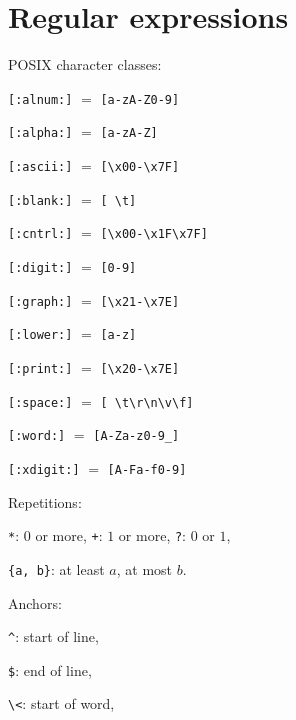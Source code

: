 \section{Regular expressions}
\begin{itemx}
\item POSIX character classes:
\begin{itemx}
\item \texttt{[:alnum:]} $=$ \texttt{[a-zA-Z0-9]}
\item \texttt{[:alpha:]} $=$ \texttt{[a-zA-Z]}
\item \texttt{[:ascii:]} $=$ \texttt{[\textbackslash{}x00-\textbackslash{}x7F]}
\item \texttt{[:blank:]} $=$ \texttt{[ \textbackslash{}t]}
\item \texttt{[:cntrl:]} $=$ \texttt{[\textbackslash{}x00-\textbackslash{}x1F\textbackslash{}x7F]}
\item \texttt{[:digit:]} $=$ \texttt{[0-9]}
\item \texttt{[:graph:]} $=$ \texttt{[\textbackslash{}x21-\textbackslash{}x7E]}
\item \texttt{[:lower:]} $=$ \texttt{[a-z]}
\item \texttt{[:print:]} $=$ \texttt{[\textbackslash{}x20-\textbackslash{}x7E]}
\item \texttt{[:space:]} $=$ \texttt{[ \textbackslash{}t\textbackslash{}r\textbackslash{}n\textbackslash{}v\textbackslash{}f]}
\item \texttt{[:word:]} $=$ \texttt{[A-Za-z0-9\_]}
\item \texttt{[:xdigit:]} $=$ \texttt{[A-Fa-f0-9]}
\end{itemx}
\item Repetitions:
\begin{itemx}
\item \texttt{*}: $0$ or more, \texttt{+}: $1$ or more, \texttt{?}: $0$ or $1$,
\item \texttt{\{a, b\}}: at least $a$, at most $b$.
\end{itemx}
\item Anchors:
\begin{itemx}
\item \texttt{\textasciicircum}: start of line,
\item \texttt{\$}: end of line, 
\item \texttt{\textbackslash{}<}: start of word, 

\end{itemx}
\end{itemx}
